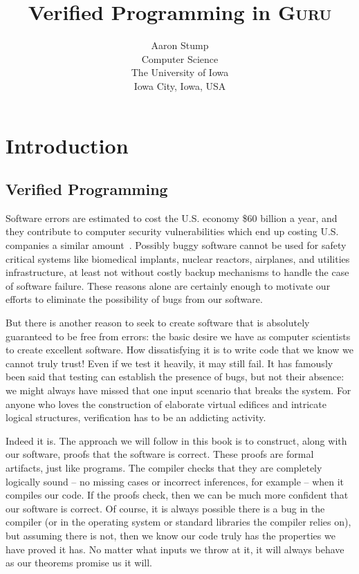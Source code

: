 \documentclass{book}[12pt]
\newcommand{\guru}[0]{\textsc{Guru}}
\begin{document}
\title{Verified Programming in \guru}

\author{Aaron Stump \\
Computer Science \\
The University of Iowa \\
Iowa City, Iowa, USA
}

\maketitle

\tableofcontents

\chapter{Introduction}
\label{ch1}

\section{Verified Programming}

Software errors are estimated to cost the U.S. economy \$60 billion a
year, and they contribute to computer security vulnerabilities which
end up costing U.S. companies a similar amount~\cite{nist02,fbi05}.
Possibly buggy software cannot be used for safety critical systems
like biomedical implants, nuclear reactors, airplanes, and utilities
infrastructure, at least not without costly backup mechanisms to
handle the case of software failure.  These reasons alone are certainly
enough to motivate our efforts to eliminate the possibility of bugs 
from our software.

But there is another reason to seek to create software that is
absolutely guaranteed to be free from errors: the basic desire we have
as computer scientists to create excellent software.  How
dissatisfying it is to write code that we know we cannot truly trust!
Even if we test it heavily, it may still fail.  It has famously been
said that testing can establish the presence of bugs, but not their
absence: we might always have missed that one input scenario that
breaks the system.  For anyone who loves the construction of elaborate
virtual edifices and intricate logical structures, verification has to
be an addicting activity.

Indeed it is.  The approach we will follow in this book is to
construct, along with our software, proofs that the software is
correct.  These proofs are formal artifacts, just like programs.  The
compiler checks that they are completely logically sound -- no missing
cases or incorrect inferences, for example -- when it compiles our
code.  If the proofs check, then we can be much more confident that
our software is correct.  Of course, it is always possible there is a
bug in the compiler (or in the operating system or standard libraries
the compiler relies on), but assuming there is not, then we know our
code truly has the properties we have proved it has.  No matter what
inputs we throw at it, it will always behave as our theorems promise
us it will.
\end{document}

